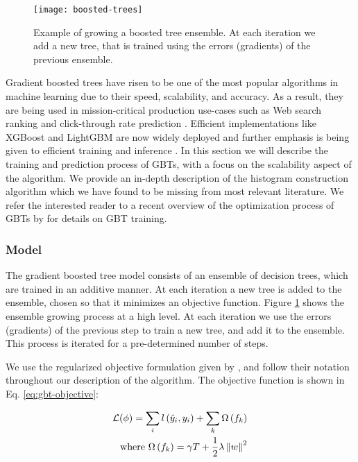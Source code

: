 \begin{figure}
	\centering
	\texttt{[image: boosted-trees]}
	\caption{Example of growing a boosted tree ensemble. At each iteration we add a new
	tree, that is trained using the errors (gradients) of the previous ensemble.}
	\label{fig:boosted-trees}
\end{figure}


Gradient boosted trees have risen to be one of the most popular algorithms
in machine learning due to their speed, scalability, and accuracy. As
a result, they are being used in mission-critical production use-cases such as Web search
ranking \cite{mcrank, catboost} and click-through rate prediction \cite{ctr-facebook}.
Efficient
implementations like XGBoost \cite{xgboost} and LightGBM \cite{lightgbm}
are now widely deployed and further emphasis
is being given to efficient training \cite{dimboost} and inference \cite{quickscorer, tree-cache-conscious, tree-runtime-opt}.
In this section we will describe the training and prediction process of GBTs,
with a focus on the scalability aspect of the algorithm. We provide an in-depth
description of the histogram construction algorithm which we have found to be missing
from most relevant literature. We refer the interested reader to a recent overview
of the optimization process of GBTs by \citet{biau-optimization} for details on GBT
training.

\subsubsection*{Model}

The gradient boosted tree model consists of an ensemble of decision trees,
which are trained in an additive manner. At each iteration a new tree is added
to the ensemble, chosen so that it minimizes an objective function. Figure \ref{fig:boosted-trees}
shows the ensemble growing process at a high level. At each iteration we use the
errors (gradients) of the previous step to train a new tree, and add it to the
ensemble. This process is iterated for a pre-determined number of steps.

We use the
regularized objective formulation given
by \citet{xgboost}, and follow their notation throughout our description of the algorithm.
The objective function is shown in Eq. \ref{eq:gbt-objective}:

\begin{equation}
	\begin{split}
	\mathcal{L}(\phi) = \sum_{i} l\left(\hat{y}_{i},y_{i}\right) + \sum_{k} \Omega\left(f_{k}\right) \\
	\text{where } \Omega\left(f_{k}\right) = \gamma T + \frac{1}{2} \lambda \left\lVert w\right\rVert^2
	\end{split}
	\label{eq:gbt-objective}
\end{equation}


